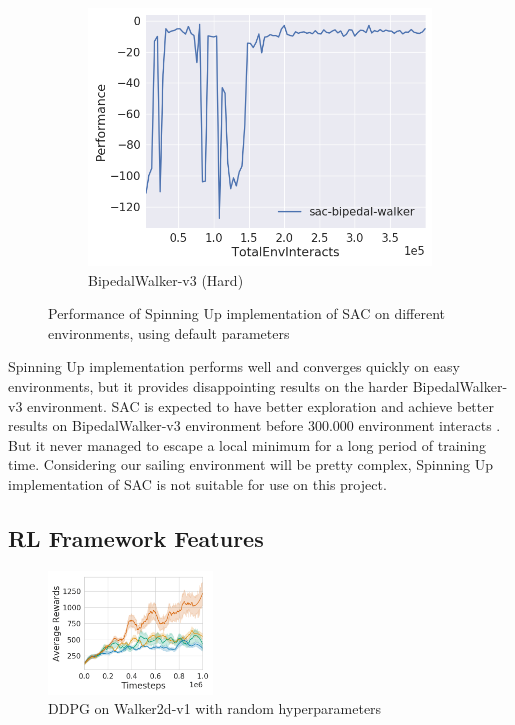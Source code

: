\begin{figure}[h]
\begin{subfigure}[t]{0.32\textwidth}
         \centering
         \includegraphics[width=\textwidth]{figures/rl-framework/sac-bipedal-walker.png}
         \caption{BipedalWalker-v3 (Hard)}
     \end{subfigure}
        \caption{Performance of Spinning Up implementation of SAC on different environments, using default parameters}
        \label{fig:spinup-SAC}
\end{figure}

Spinning Up implementation performs well and converges quickly on easy environments, but it provides disappointing results on the harder BipedalWalker-v3 environment. SAC is expected to have better exploration and achieve better results on BipedalWalker-v3 environment before 300.000 environment interacts \cite{gym-leaderboard}. But it never managed to escape a local minimum for a long period of training time. Considering our sailing environment will be pretty complex, Spinning Up implementation of SAC is not suitable for use on this project.

\subsection{RL Framework Features} \label{RLF:framework-features}

\begin{figure}
\vspace{-4em}
\centering
\includegraphics[width = 0.39\textwidth]{figures/rl-framework/hyperparameter-ddpg.png}
\caption{DDPG on Walker2d-v1 with random hyperparameters \cite{hyperparameter-ddpg}}
\label{fig:hyperparameter-ddpg}
\vspace{-1em}
\end{figure}

